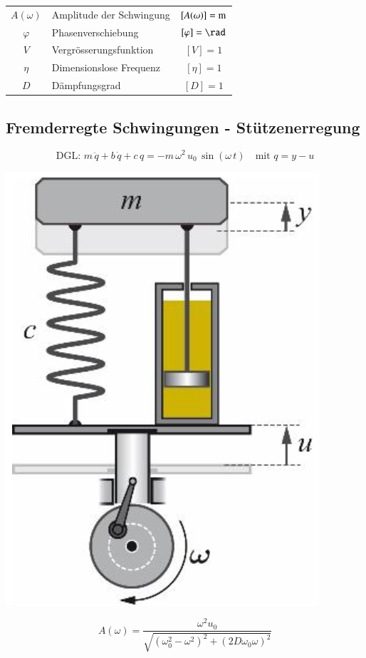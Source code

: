 \begin{tabular}{c l c}
$A(\omega)$ & Amplitude der Schwingung & $[A(\omega)] = \mathrm{m}$ \\
$\varphi$ & Phasenverschiebung & $[ \varphi] = \rad$ \\
$V$ & Vergrösserungsfunktion & $[V] = 1$ \\
$\eta$ & Dimensionslose Frequenz & $[\eta] = 1$  \\
$D$ & Dämpfungsgrad & $[D] = 1$ \\
\end{tabular}




\subsection{Fremderregte Schwingungen - Stützenerregung}

$$ \boxed{ \text{DGL: } m \, \ddot{q} + b \, \dot{q} + c \, q = -m \, \omega^2 \, u_0 \, \sin(\omega \, t)  \quad \text{mit } q = y - u } $$

\begin{minipage}{0.25\linewidth}
\includegraphics[width=0.9\linewidth]{Bilder/Wellen-Optik/stuetzenerregung} 
\end{minipage}
\hfill
\begin{minipage}{0.72\linewidth}
$$ A(\omega) = \frac{\omega^2 u_0}{\sqrt{(\omega_0^2 -\omega^2)^2 + (2D \omega_0 \omega)^2}} $$ 
\end{minipage}

